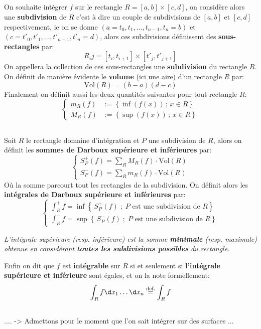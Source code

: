 \subsection*{}
On souhaite intégrer \(f\) sur le rectangle \(R = [a, b] \times [c, d]\), on considère alors une \textbf{subdivision} de \(R\) c'est à dire un couple de subdivisions de \([a, b] \text{ et } [c, d]\) respectivement, ie on se donne \((a = t_0, t_1, \ldots, t_{n-1}, t_n = b)\) et \((c = t'_0, t'_1, \ldots, t'_{n-1}, t'_n = d)\), alors ces subdivisions définissent des \textbf{sous-rectangles} par:
\[
   R_ij = [t_i, t_{i+1}] \times [t'_j, t'_{j+1}]   
\]
On appellera la collection de ces sous-rectangles une \textbf{subdivision} du rectangle \(R\). On définit de manière évidente le \textbf{volume} (ici une aire) d'un rectangle \(R\) par:
\[
   \text{Vol}(R) = (b - a)(d - c) 
\]
Finalement on définit aussi les deux quantités suivantes pour tout rectangle \(R\):
\[
   \begin{cases}
      m_R(f) &:= \left\{ \inf(f(x)) \, ; \, x \in R \right\}\\
      M_R(f) &:= \left\{ \sup(f(x)) \, ; \, x \in R \right\}
   \end{cases}   
\]
\pagebreak
\subsection*{}
Soit \(R\) le rectangle domaine d'intégration et \(P\) une subdivision de \(R\), alors on définit les \textbf{sommes de Darboux supérieure et inférieures} par:
\[
   \begin{cases}
      S_P^+(f) = \sum_R M_R(f) \cdot \text{Vol}(R)\\
      S_P^-(f) = \sum_R m_R(f) \cdot \text{Vol}(R) 
   \end{cases}
\] 
Où la somme parcourt tout les rectangles de la subdivision. On définit alors les \textbf{intégrales de Darboux supérieure et inférieures} par:
\[
   \begin{cases}
      \displaystyle\int_R^+{f} = \inf\left\{\, S_P^+(f)\; ; \; P \text{ est une subdivision de } R\right\}\\
      \displaystyle\int_R^-{f} = \sup\left\{\, S_P^-(f)\; ; \; P \text{ est une subdivision de } R\right\}
   \end{cases}
\]
\begin{center}
   \textit{
      L'intégrale supérieure (resp. inférieure) est la somme \textbf{minimale} (resp. maximale) obtenue en considérant \textbf{toutes les subdivisions possibles} du rectangle.
   }
\end{center}
Enfin on dit que \(f\) est \textbf{intégrable} sur \(R\) si et seulement si \textbf{l'intégrale supérieure et inférieure} sont égales, et on la note formellement:
\[
   \int_R f \d x_1 \ldots \d x_n \overset{\text{def.}}{=} \int_R f 
\]


\subsection*{}


.... -> Admettons pour le moment que l'on sait intégrer sur des surfaces ...
